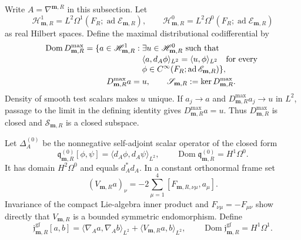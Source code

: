 Write \(A=\nabla^{\mathbf m,R}\) in this subsection.  Let
\begin{equation}
 \mathscr H_{\mathbf m,R}^1
 =L^2\Omega^1(F_R;\operatorname{ad}\mathscr E_{\mathbf m,R}),
 \qquad
 \mathscr H_{\mathbf m,R}^0
 =L^2\Omega^0(F_R;\operatorname{ad}\mathscr E_{\mathbf m,R})
 \label{cusp-native-full-flux-suN-real-Hilbert-spaces}
\end{equation}
as real Hilbert spaces.  Define the maximal distributional codifferential
by
\begin{align}
 \operatorname{Dom}D_{\mathbf m,R}^{\max}
 =\{a\in\mathscr H_{\mathbf m,R}^1:\;&
 \exists u\in\mathscr H_{\mathbf m,R}^0\text{ such that}\notag\\[-1mm]
 &\langle a,d_A\phi\rangle_{L^2}
 =\langle u,\phi\rangle_{L^2}
 \quad\text{for every }\notag\\[-1mm]
 &\phi\in C^\infty(F_R;\operatorname{ad}\mathscr E_{\mathbf m,R})\},
 \label{cusp-native-full-flux-suN-max-codiff-domain}\\
 D_{\mathbf m,R}^{\max}a={}&u,
 \qquad
 \mathscr S_{\mathbf m,R}:=\ker D_{\mathbf m,R}^{\max}.
 \label{cusp-native-full-flux-suN-Coulomb-slice}
\end{align}
Density of smooth test scalars makes \(u\) unique.  If
\(a_j\to a\) and \(D_{\mathbf m,R}^{\max}a_j\to u\) in \(L^2\), passage to
the limit in the defining identity gives
\(D_{\mathbf m,R}^{\max}a=u\).  Thus \(D_{\mathbf m,R}^{\max}\) is closed
and \(\mathscr S_{\mathbf m,R}\) is a closed subspace.

Let \(\Delta_A^{(0)}\) be the nonnegative self-adjoint scalar operator of
the closed form
\begin{equation}
 \mathfrak q_{\mathbf m,R}^{(0)}[\phi,\psi]
 =\langle d_A\phi,d_A\psi\rangle_{L^2},
 \qquad
 \operatorname{Dom}\mathfrak q_{\mathbf m,R}^{(0)}=H^1\Omega^0.
 \label{cusp-native-full-flux-suN-scalar-form}
\end{equation}
It has domain \(H^2\Omega^0\) and equals \(d_A^*d_A\).  In a constant
orthonormal frame set
\begin{equation}
 (V_{\mathbf m,R}a)_\nu
 =-2\sum_{\mu=1}^4[F_{\mathbf m,R,\nu\mu},a_\mu].
 \label{cusp-native-full-flux-suN-spin-endomorphism}
\end{equation}
Invariance of the compact Lie-algebra inner product and
\(F_{\nu\mu}=-F_{\mu\nu}\) show directly that \(V_{\mathbf m,R}\) is a
bounded symmetric endomorphism.  Define
\begin{equation}
 \mathfrak j_{\mathbf m,R}^{\mathrm{gf}}[a,b]
 =\langle\nabla_A a,\nabla_A b\rangle_{L^2}
  +\langle V_{\mathbf m,R}a,b\rangle_{L^2},
 \qquad
 \operatorname{Dom}\mathfrak j_{\mathbf m,R}^{\mathrm{gf}}
 =H^1\Omega^1.
 \label{cusp-native-full-flux-suN-Jacobi-form}
\end{equation}

